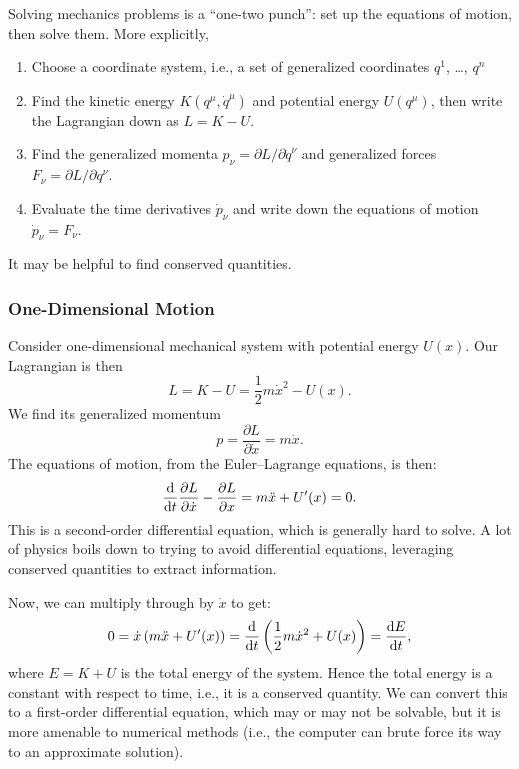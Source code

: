Solving mechanics problems is a ``one-two punch'': set up the equations
of motion, then solve them. More explicitly,
\begin{enumerate}
\item Choose a coordinate system, i.e., a set of generalized coordinates
  $q^{1}$, \dots, $q^{n}$
\item Find the kinetic energy $K(q^{\mu},\dot{q}^{\mu})$ and potential
  energy $U(q^{\mu})$, then write the Lagrangian down as $L=K-U$.
\item Find the generalized momenta $p_{\nu} = \partial L/\partial\dot{q}^{\nu}$
  and generalized forces $F_{\nu} = \partial L/\partial q^{\nu}$.
\item Evaluate the time derivatives $\dot{p}_{\nu}$ and write down the
  equations of motion $\dot{p}_{\nu}=F_{\nu}$.
\end{enumerate}
It may be helpful to find conserved quantities.

\subsubsection{One-Dimensional Motion}

Consider one-dimensional mechanical system with potential energy
$U(x)$. Our Lagrangian is then
\begin{equation}
L = K - U = \frac{1}{2}m\dot{x}^{2} - U(x).
\end{equation}
We find its generalized momentum
\begin{equation}
p = \frac{\partial L}{\partial\dot{x}} = m\dot{x}.
\end{equation}
The equations of motion, from the Euler--Lagrange equations, is then:
\begin{equation}
\frac{\mathrm{d}}{\mathrm{d} t}\frac{\partial L}{\partial\dot{x}} - \frac{\partial L}{\partial x} = m\ddot{x} + U'(x) = 0.
\end{equation}
This is a second-order differential equation, which is generally hard to solve.
A lot of physics boils down to trying to avoid differential equations,
leveraging conserved quantities to extract information.

Now, we can multiply through by $\dot{x}$ to get:
\begin{equation}
0 = \dot{x}\left(m\ddot{x} + U'(x)\right) = \frac{\mathrm{d}}{\mathrm{d} t}\left(\frac{1}{2}m\dot{x}^{2}+U(x)\right)
= \frac{\mathrm{d} E}{\mathrm{d} t},
\end{equation}
where $E=K+U$ is the total energy of the system. Hence the total energy
is a constant with respect to time, i.e., it is a conserved
quantity. We can convert this to a first-order differential equation,
which may or may not be solvable, but it is more amenable to numerical
methods (i.e., the computer can brute force its way to an approximate solution).

